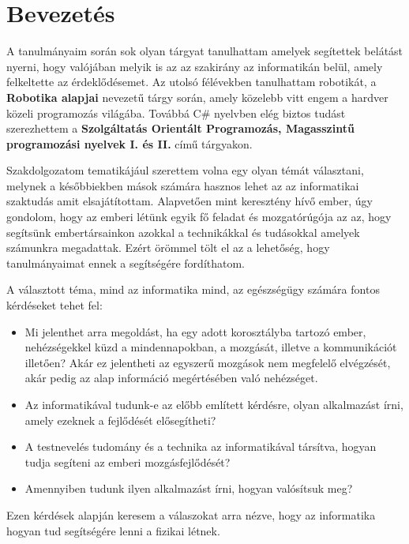 \documentclass[tocnopagenum]{thesis-ekf}
\theoremstyle{definition}
\theoremstyle{remark}
\begin{document}
	\chapter{Bevezetés}
	\par
	A tanulmányaim során sok olyan tárgyat tanulhattam amelyek segítettek belátást nyerni, hogy valójában melyik is az az szakirány az informatikán belül, amely felkeltette az érdeklődésemet. Az utolsó félévekben tanulhattam robotikát, a \textbf{Robotika alapjai} nevezetű tárgy során, amely közelebb vitt engem a hardver közeli programozás világába. Továbbá C\# nyelvben elég biztos tudást szerezhettem a \textbf{Szolgáltatás Orientált Programozás, Magasszintű programozási nyelvek I. és II.} című tárgyakon.
	\par
	Szakdolgozatom tematikájául szerettem volna egy olyan témát választani, melynek a későbbiekben mások számára hasznos lehet az az informatikai szaktudás amit elsajátítottam.
	Alapvetően mint keresztény hívő ember, úgy gondolom, hogy az emberi létünk egyik fő feladat és mozgatórúgója az az, hogy segítsünk embertársainkon azokkal a technikákkal és tudásokkal amelyek számunkra megadattak. Ezért örömmel tölt el az a lehetőség, hogy tanulmányaimat ennek a segítségére fordíthatom. 
	\par
	A választott téma, mind az informatika mind, az egészségügy számára fontos kérdéseket tehet fel:
	\begin{itemize}
		\item  Mi jelenthet arra megoldást, ha egy adott korosztályba tartozó ember, nehézségekkel küzd a mindennapokban, a mozgását, illetve a kommunikációt illetően? Akár ez jelentheti az egyszerű mozgások nem megfelelő elvégzését, akár pedig az alap információ megértésében való nehézséget.
		\item  Az informatikával tudunk-e az előbb említett kérdésre, olyan alkalmazást írni, amely ezeknek a fejlődését elősegítheti?
		\item A testnevelés tudomány és a technika az informatikával társítva, hogyan tudja segíteni az emberi mozgásfejlődését?
		\item Amennyiben tudunk ilyen alkalmazást írni, hogyan valósítsuk meg?
	
	\end{itemize}
 	Ezen kérdések alapján keresem a válaszokat arra nézve, hogy az informatika hogyan tud segítségére lenni a fizikai létnek. 
 
\end{document}
